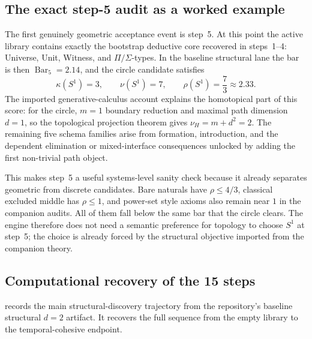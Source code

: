 \documentclass[pdflatex,sn-mathphys,Numbered]{sn-jnl}
\theoremstyle{thmstyleone}
\theoremstyle{thmstylethree}
\theoremstyle{thmstyletwo}
\DeclareMathOperator{\BarOp}{Bar}
\begin{document}
\subsection{The exact step-5 audit as a worked example}

The first genuinely geometric acceptance event is step~5. At this point the active library contains exactly the bootstrap deductive core recovered in steps~1--4: Universe, Unit, Witness, and $\Pi/\Sigma$-types. In the baseline structural lane the bar is then $\BarOp_5=2.14$, and the circle candidate satisfies
\[
  \kappa(S^1)=3, \qquad \nu(S^1)=7, \qquad \rho(S^1)=\frac{7}{3}\approx 2.33.
\]
The imported generative-calculus account explains the homotopical part of this score: for the circle, $m=1$ boundary reduction and maximal path dimension $d=1$, so the topological projection theorem gives $\nu_H = m+d^2 = 2$. The remaining five schema families arise from formation, introduction, and the dependent elimination or mixed-interface consequences unlocked by adding the first non-trivial path object.

This makes step~5 a useful systems-level sanity check because it already separates geometric from discrete candidates. Bare naturals have $\rho \leq 4/3$, classical excluded middle has $\rho \leq 1$, and power-set style axioms also remain near $1$ in the companion audits. All of them fall below the same bar that the circle clears. The engine therefore does not need a semantic preference for topology to choose $S^1$ at step~5; the choice is already forced by the structural objective imported from the companion theory.

\subsection{Computational recovery of the 15 steps}

 records the main structural-discovery trajectory from the repository's baseline structural $d=2$ artifact. It recovers the full sequence from the empty library to the temporal-cohesive endpoint.
\end{document}
